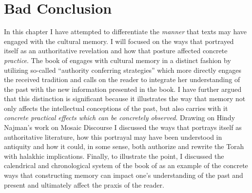 
\section{Bad Conclusion}

In this chapter I have attempted to differentiate the \emph{manner} that \rwb texts may have engaged with the cultural memory. I will focused on the ways that \jub portrayed itself as an authoritative revelation and how that posture affected concrete \emph{practice}. The book of \jub engages with cultural memory in a distinct fashion \visavis \ga by utilizing so-called ``authority conferring strategies'' which more directly engages the received tradition and calls on the reader to integrate her understanding of the past with the new information presented in the book. I have further argued that this distinction is significant because it illustrates the way that memory not only affects the intellectual conceptions of the past, but also carries with it \emph{concrete practical effects which can be concretely observed}. Drawing on Hindy Najman's work on Mosaic Discourse I discussed the ways that \jub portrays itself as authoritative literature, how this portrayal may have been understood in antiquity and how it could, in some sense, both authorize and rewrite the Torah with halakhic implications. Finally, to illustrate the point, I discussed the calendrical and chronological system of the book of \jub as an example of the concrete ways that constructing memory can impact one's understanding of the past and present and ultimately affect the praxis of the reader.